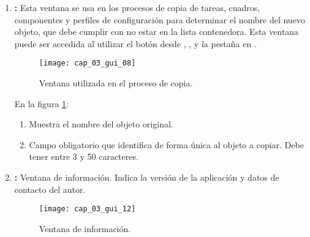 \documentclass[\main/main.tex]{subfiles}
\begin{document}
\begin{enumerate}
				\item \textbf{:} Esta ventana se usa en los procesos de copia de tareas, cuadros, componentes y perfiles de configuración para determinar el nombre del nuevo objeto, que debe cumplir con no estar en la lista contenedora. Esta ventana puede ser accedida al utilizar el botón  desde , ,  y la pestaña  en . 
				\begin{figure}[H]
					\centering
					\texttt{[image: cap\_03\_gui\_08]}
					\caption{Ventana utilizada en el proceso de copia.}
					\label{fig:03_gui_copy}
				\end{figure}

				\vspace{-5mm}

				En la figura \ref{fig:03_gui_copy}:
				\begin{enumerate}[(1)]\setlength\itemsep{-0.5em}
					\item Muestra el nombre del objeto original.
					\item Campo obligatorio que identifica de forma única al objeto a copiar. Debe tener entre 3 y 50 caracteres.
				\end{enumerate}

				\item \textbf{:} Ventana de información. Indica la versión de la aplicación y datos de contacto del autor.
				\begin{figure}[H]
					\centering
					\texttt{[image: cap\_03\_gui\_12]}
					\caption{Ventana de información.}
					\label{fig:03_gui_about}
				\end{figure}

			\end{enumerate}		 

\end{document}
